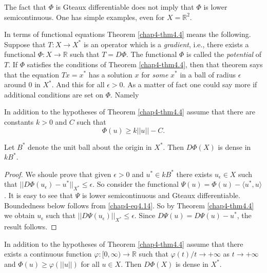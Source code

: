 \begin{remark}\label{chap4-rem1}
The fact that $\Phi$ is Gteaux differentiable does not imply that
$\Phi$ is lower semicontinuous. One has simple examples, even for
$X=\mathbb{R}^{2}$. 
\end{remark}

\begin{remark}\label{chap4-rem2}
In terms of functional equations Theorem \ref{chap4-thm4.4} means the
following. Suppose that $T:X\to X^{*}$ is an operator which is a {\em
  gradient}, i.e., there exists a functional $\Phi:X\to \mathbb{R}$
such that $T=D\Phi$. The functional $\Phi$ is called the {\em
  potential} of $T$. If $\Phi$ satisfies the conditions of Theorem
\ref{chap4-thm4.4}, then that theorem says that the equation
$Tx=x^{*}$ has a solution $x$ for {\em some} $x^{*}$ in a ball of
radius $\epsilon$ around $0$ in $X^{*}$. And this for all
$\epsilon>0$. As a matter of fact one could say more if additional
conditions are set on $\Phi$. Namely
\end{remark}

\begin{theorem}\label{chap4-thm4.5}
In addition to the hypotheses of Theorem \ref{chap4-thm4.4} assume
that there are constants $k>0$ and $C$ such that
$$
\Phi(u)\geq k||u||-C.
$$

Let $B^{*}$ denote the unit ball about the origin in $X^{*}$. Then
$D\Phi(X)$ is dense in $kB^{*}$. 
\end{theorem}

\begin{proof}
We shoule prove that given $\epsilon>0$ and $u^{*}\in kB^{*}$ there
exists $u_{\epsilon}\in X$ such that
$||D\Phi(u_{\epsilon})-u^{*}||_{X^{*}}\leq \epsilon$. So consider the
functional $\Psi(u)=\Phi(u)-\langle u^{*},u\rangle$.\pageoriginale 
It is easy to see that $\Psi$ is lower semicontinuous and Gteaux
differentiable. Boundedness below follows from
\eqref{chap4-eq4.14}. So by Theorem \ref{chap4-thm4.4} we obtain
$u_{\epsilon}$ such that $||D\Psi(u_{\epsilon})||_{X^{*}}\leq
\epsilon$. Since $D\Psi(u)=D\Psi(u)-u^{*}$, the result follows.
\end{proof}

\begin{corollary}\label{chap4-coro4.6}
In addition to the hypotheses of Theorem \ref{chap4-thm4.4} assume
that there exists a continuous function $\varphi:[0,\infty)\to
  \mathbb{R}$ such that $\varphi(t)/t\to +\infty$ as $t\to +\infty$
  and $\Phi(u)\geq \varphi(||u||)$ for all $u\in X$. Then $D\Phi(X)$
  is dense in $X^{*}$. 
\end{corollary}

